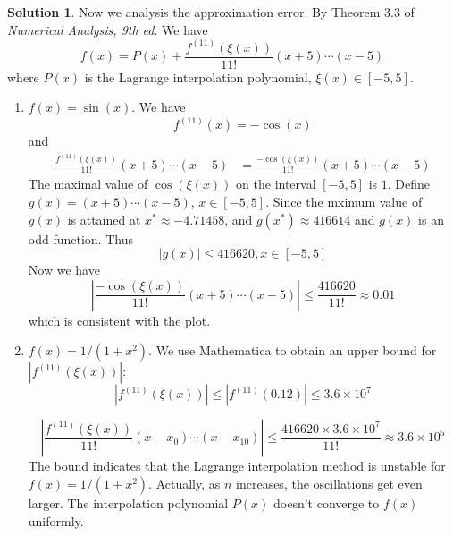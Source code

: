 \documentclass{article}
\theoremstyle{definition}
\newtheorem{solution}{Solution}
\begin{document}
\begin{solution}
    Now we analysis the approximation error. By Theorem 3.3 of \emph{Numerical Analysis, 9th ed}. We have
    \begin{equation}
      f(x)=P(x)+\frac{f^{(11)}(\xi(x))}{11!}(x+5)\cdots(x-5)
    \end{equation}
    where $P(x)$ is the Lagrange interpolation polynomial, $\xi(x)\in[-5,5]$.
    \begin{enumerate}
      \item $f(x)=\sin(x)$. We have
      \begin{equation}
        f^{(11)}(x)=-\cos(x)
      \end{equation}
      and 
      \begin{align*}
      \frac{f^{(11)}(\xi(x))}{11!}(x+5)\cdots(x-5)&=\frac{-\cos(\xi(x))}{11!}(x+5)\cdots(x-5)
      \end{align*}
      The maximal value of $\cos(\xi(x))$ on the interval $[-5,5]$ is $1$. Define $g(x)=(x+5)\cdots(x-5)$, $x\in[-5,5]$.
      Since the mximum value of $g(x)$ is attained at $x^*\approx-4.71458$, and $g(x^*)\approx416614$ and $g(x)$ is an odd function. Thus
      \begin{equation}
        |g(x)|\leq 416620, x\in[-5,5]
      \end{equation}
      Now we have
      \begin{equation}
        |\frac{-\cos(\xi(x))}{11!}(x+5)\cdots(x-5)|\leq \frac{416620}{11!}\approx 0.01
      \end{equation}
      which is consistent with the plot.

      \item $f(x)=1/(1+x^2)$. We use Mathematica to obtain an upper bound for $|f^{(11)}(\xi(x))|$:
      \begin{equation}
        |f^{(11)}(\xi(x))|\leq |f^{(11)}(0.12)|\leq 3.6\times 10^7
      \end{equation}

      \begin{equation}
        |\frac{f^{(11)}(\xi(x))}{11!}(x-x_0)\cdots(x-x_{10})|\leq \frac{416620\times 3.6\times 10^7}{11!}\approx 3.6\times 10^5
      \end{equation}
      The bound indicates that the Lagrange interpolation method is unstable for $f(x)=1/(1+x^2)$. Actually, as $n$ increases, the oscillations get even larger. The interpolation polynomial $P(x)$ doesn't converge to $f(x)$ uniformly.
      




    \end{enumerate}
    
\end{solution}
\end{document}
